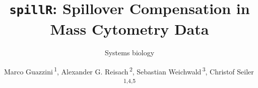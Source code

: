 \documentclass{bioinfo}
\begin{document}

\subtitle{Systems biology}

\title[Spillover Compensation]{\texttt{spillR}: Spillover Compensation
in Mass Cytometry Data}

\author[FirstAuthorLastName \textit{et~al}.]{
Marco Guazzini\,\textsuperscript{1}, Alexander G.
Reisach\,\textsuperscript{2}, Sebastian
Weichwald\,\textsuperscript{3}, Christof Seiler\,\textsuperscript{1,4,5}
}

\address{
\textsuperscript{1}Department of Advanced Computing Sciences, Maastricht
University, The Netherlands\\
\textsuperscript{2}Université Paris Cité, CNRS, MAP5, F-75006 Paris,
France\\
\textsuperscript{3}Department of Mathematical Sciences, University of
Copenhagen, Denmark\\
\textsuperscript{4}Mathematics Centre Maastricht, Maastricht University,
The Netherlands\\
\textsuperscript{5}Center of Experimental Rheumatology, Department of
Rheumatology, University Hospital Zurich, University of Zurich,
Switzerland\\
}



\end{document}
